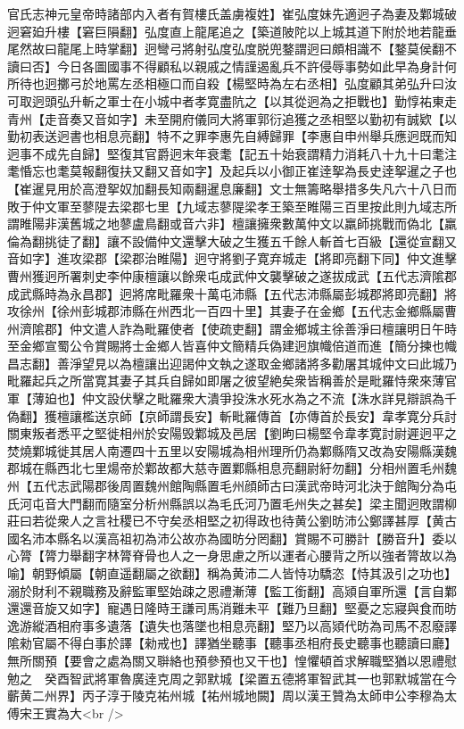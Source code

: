 官氏志神元皇帝時諸部内入者有賀樓氏盖虜複姓】崔弘度妹先適迥子為妻及鄴城破迥窘廹升樓【窘巨隕翻】弘度直上龍尾追之【築道陂陀以上城其道下附於地若龍垂尾然故曰龍尾上時掌翻】迥彎弓將射弘度弘度脱兜鍪謂迥曰頗相識不【鍪莫侯翻不讀曰否】今日各圖國事不得顧私以親戚之情謹遏亂兵不許侵辱事勢如此早為身計何所待也迥擲弓於地罵左丞相極口而自殺【楊堅時為左右丞相】弘度顧其弟弘升曰汝可取迥頭弘升斬之軍士在小城中者孝寛盡阬之【以其從迥為之拒戰也】勤惇祐東走青州【走音奏又音如字】未至開府儀同大將軍郭衍追獲之丞相堅以勤初有誠欵【以勤初表送迥書也相息亮翻】特不之罪李惠先自縛歸罪【李惠自申州舉兵應迥既而知迥事不成先自歸】堅復其官爵迥末年衰耄【記五十始衰謂精力消耗八十九十曰耄注耄惛忘也耄莫報翻復扶又翻又音如字】及起兵以小御正崔逹挐為長史逹挐暹之子也【崔暹見用於高澄挐奴加翻長知兩翻暹息廉翻】文士無籌略舉措多失凡六十八日而敗于仲文軍至蓼隄去梁郡七里【九域志蓼隄梁孝王築至睢陽三百里按此則九域志所謂睢陽非漢舊城之地蓼盧鳥翻或音六非】檀讓擁衆數萬仲文以羸師挑戰而偽北【羸倫為翻挑徒了翻】讓不設備仲文還擊大破之生獲五千餘人斬首七百級【還從宣翻又音如字】進攻梁郡【梁郡治睢陽】迥守將劉子寛弃城走【將即亮翻下同】仲文進擊曹州獲迥所署刺史李仲康檀讓以餘衆屯成武仲文襲擊破之遂拔成武【五代志濟隂郡成武縣時為永昌郡】迥將席毗羅衆十萬屯沛縣【五代志沛縣屬彭城郡將即亮翻】將攻徐州【徐州彭城郡沛縣在州西北一百四十里】其妻子在金鄉【五代志金鄉縣屬曹州濟隂郡】仲文遣人詐為毗羅使者【使疏吏翻】謂金鄉城主徐善淨曰檀讓明日午時至金鄉宣蜀公令賞賜將士金鄉人皆喜仲文簡精兵偽建迥旗幟倍道而進【簡分揀也幟昌志翻】善淨望見以為檀讓出迎謁仲文執之遂取金鄉諸將多勸屠其城仲文曰此城乃毗羅起兵之所當寛其妻子其兵自歸如即屠之彼望絶矣衆皆稱善於是毗羅恃衆來薄官軍【薄廹也】仲文設伏擊之毗羅衆大潰爭投洙水死水為之不流【洙水詳見辯誤為千偽翻】獲檀讓檻送京師【京師謂長安】斬毗羅傳首【亦傳首於長安】韋孝寛分兵討關東叛者悉平之堅徙相州於安陽毁鄴城及邑居【劉昫曰楊堅令韋孝寛討尉遲迥平之焚燒鄴城徙其居人南遷四十五里以安陽城為相州理所仍為鄴縣隋又改為安陽縣漢魏郡城在縣西北七里煬帝於鄴故都大慈寺置鄴縣相息亮翻尉紆勿翻】分相州置毛州魏州【五代志武陽郡後周置魏州館陶縣置毛州顔師古曰漢武帝時河北決于館陶分為屯氏河屯音大門翻而隨室分析州縣誤以為毛氏河乃置毛州失之甚矣】梁主聞迥敗謂柳莊曰若從衆人之言社稷已不守矣丞相堅之初得政也待黄公劉昉沛公鄭譯甚厚【黄古國名沛本縣名以漢高祖初為沛公故亦為國昉分罔翻】賞賜不可勝計【勝音升】委以心膂【膂力舉翻字林膂脊骨也人之一身思慮之所以運者心腰背之所以強者膂故以為喻】朝野傾屬【朝直遥翻屬之欲翻】稱為黄沛二人皆恃功驕恣【恃其汲引之功也】溺於財利不親職務及辭監軍堅始疎之恩禮漸薄【監工銜翻】高熲自軍所還【言自鄴還還音旋又如字】寵遇日隆時王謙司馬消難未平【難乃旦翻】堅憂之忘寢與食而昉逸游縱酒相府事多遺落【遺失也落墜也相息亮翻】堅乃以高熲代昉為司馬不忍廢譯隂勑官屬不得白事於譯【勑戒也】譯猶坐聽事【聽事丞相府長史聽事也聽讀曰廳】無所關預【要會之處為關又聨絡也預參預也又干也】惶懼頓首求解職堅猶以恩禮慰勉之　癸酉智武將軍魯廣逹克周之郭默城【梁置五德將軍智武其一也郭默城當在今蘄黄二州界】丙子淳于陵克祐州城【祐州城地闕】周以漢王贊為太師申公李穆為太傅宋王實為大<br />
